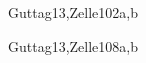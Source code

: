 \begin{syllabus}
\begin{unit}{\ALBasicAnalysis}{}{Guttag13,Zelle10}{2}{a,b}
    \begin{learningoutcomes}       
	\item \ALBasicAnalysisLOExplain [\Familiarity] 
        \item \ALBasicAnalysisLOIn [\Familiarity] 
        \item \ALBasicAnalysisLOState [\Familiarity] 
        \item \ALBasicAnalysisLOUse [\Usage] 
        \item \ALBasicAnalysisLOUseBig [\Usage] 
    \end{learningoutcomes}
\end{unit}

\begin{unit}{\ALFundamentalDataStructuresandAlgorithms}{}{Guttag13,Zelle10}{8}{a,b}
    \begin{topics}
        \item \ALFundamentalDataStructuresandAlgorithmsTopicSimple
        \item \ALFundamentalDataStructuresandAlgorithmsTopicSequential
        \item \ALFundamentalDataStructuresandAlgorithmsTopicWorst
        \item \ALFundamentalDataStructuresandAlgorithmsTopicWorstOr
        \item \ALFundamentalDataStructuresandAlgorithmsTopicHash
        \item \ALFundamentalDataStructuresandAlgorithmsTopicBinary
        \item \ALFundamentalDataStructuresandAlgorithmsTopicGraphs
        \item \ALFundamentalDataStructuresandAlgorithmsTopicHeaps
        \item \ALFundamentalDataStructuresandAlgorithmsTopicGraphsAnd
        \item \ALFundamentalDataStructuresandAlgorithmsTopicPattern
    \end{topics}


\end{unit}
\end{syllabus}
